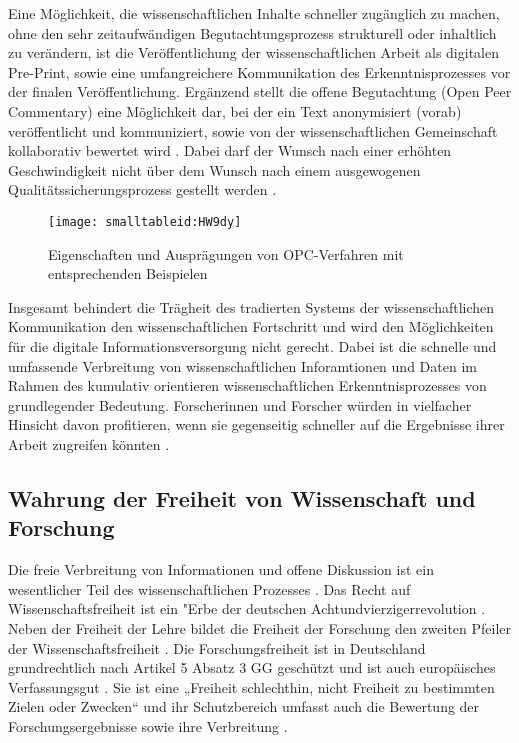 Eine Möglichkeit, die wissenschaftlichen Inhalte schneller zugänglich zu machen, ohne den sehr zeitaufwändigen Begutachtungsprozess strukturell oder inhaltlich zu verändern, ist die Veröffentlichung der wissenschaftlichen Arbeit als digitalen Pre-Print, sowie eine umfangreichere Kommunikation des Erkenntnisprozesses vor der finalen Veröffentlichung. Ergänzend stellt die offene Begutachtung (Open Peer Commentary) eine Möglichkeit dar, bei der ein Text anonymisiert (vorab) veröffentlicht und kommuniziert, sowie von der wissenschaftlichen Gemeinschaft kollaborativ bewertet wird \cite{mueller_2009_peerreview}. Dabei darf der Wunsch nach einer erhöhten Geschwindigkeit nicht über dem Wunsch nach einem ausgewogenen Qualitätssicherungsprozess gestellt werden \cite{Beall_2012}.

\begin{figure}[h!]
\texttt{[image: smalltableid:HW9dy]}
\caption{Eigenschaften und Ausprägungen von OPC-Verfahren mit entsprechenden Beispielen}
\end{figure}

Insgesamt behindert die Trägheit des tradierten Systems der wissenschaftlichen Kommunikation den wissenschaftlichen Fortschritt und wird den Möglichkeiten für die digitale Informationsversorgung nicht gerecht. Dabei ist die schnelle und umfassende Verbreitung von wissenschaftlichen Inforamtionen und Daten im Rahmen des kumulativ orientieren wissenschaftlichen Erkenntnisprozesses von grundlegender Bedeutung. Forscherinnen und Forscher würden in vielfacher Hinsicht davon profitieren, wenn sie gegenseitig schneller auf die Ergebnisse ihrer Arbeit zugreifen könnten \cite{nosek_2012_scientific} \cite{winkler_2011_anforderungen}.

\subsection{Wahrung der Freiheit von Wissenschaft und Forschung}

Die freie Verbreitung von Informationen und offene Diskussion ist ein wesentlicher Teil des wissenschaftlichen Prozesses \cite{edsall_1976_scientific}. Das Recht auf Wissenschaftsfreiheit ist ein "Erbe der deutschen Achtundvierzigerrevolution \cite{kempny_2013_wissfreiheit}. Neben der Freiheit der Lehre bildet die Freiheit der Forschung den zweiten Pfeiler der Wissenschaftsfreiheit \cite{thurnherr_2014_pubfreiheit}. Die Forschungsfreiheit ist in Deutschland grundrechtlich nach Artikel 5 Absatz 3 GG  geschützt und ist auch europäisches Verfassungsgut \cite{kempny_2013_wissfreiheit}. Sie ist eine „Freiheit schlechthin, nicht Freiheit zu bestimmten Zielen oder Zwecken“ \cite{Boeckenfoerde_1974} und ihr Schutzbereich umfasst auch die Bewertung der Forschungsergebnisse sowie ihre Verbreitung \cite{Pfeiffer_2013_forschungsfreiheit}.

